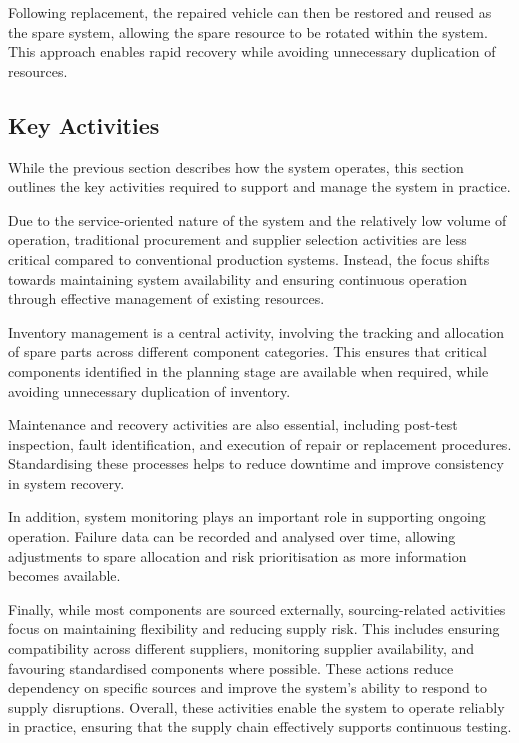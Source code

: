 Following replacement, the repaired vehicle can then be restored and reused as the spare system, allowing the spare resource to be rotated within the system. This approach enables rapid recovery while avoiding unnecessary duplication of resources.

\subsection{Key Activities}

While the previous section describes how the system operates, this section outlines the key activities required to support and manage the system in practice.

Due to the service-oriented nature of the system and the relatively low volume of operation, traditional procurement and supplier selection activities are less critical compared to conventional production systems. Instead, the focus shifts towards maintaining system availability and ensuring continuous operation through effective management of existing resources.

Inventory management is a central activity, involving the tracking and allocation of spare parts across different component categories. This ensures that critical components identified in the planning stage are available when required, while avoiding unnecessary duplication of inventory.

Maintenance and recovery activities are also essential, including post-test inspection, fault identification, and execution of repair or replacement procedures. Standardising these processes helps to reduce downtime and improve consistency in system recovery.

In addition, system monitoring plays an important role in supporting ongoing operation. Failure data can be recorded and analysed over time, allowing adjustments to spare allocation and risk prioritisation as more information becomes available.

Finally, while most components are sourced externally, sourcing-related activities focus on maintaining flexibility and reducing supply risk. This includes ensuring compatibility across different suppliers, monitoring supplier availability, and favouring standardised components where possible. These actions reduce dependency on specific sources and improve the system’s ability to respond to supply disruptions. Overall, these activities enable the system to operate reliably in practice, ensuring that the supply chain effectively supports continuous testing.

